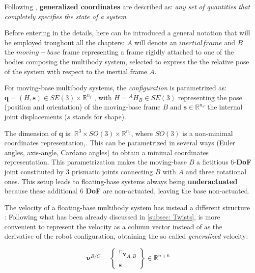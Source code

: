     Following \cite{Marion-et-al.}, \textbf{generalized coordinates} are described as: \textit{any set of quantities that completely specifies the state of a system}

    Before entering in the details, here can be introduced a general notation that will be employed troughout all the chapters:
    $A$ will denote an $inertial frame$ and $B$ the $moving-base$ frame representing a frame rigidly attached to one of the bodies composing the multibody system, selected to express the the relative pose of the system with respect to the inertial frame $A$.
    
    For moving-base multibody systems, the \textit{configuration} is parametrized as: $ \mathbf{q} = ( {H},  \mathbf{s}) \in SE(3) \times \mathbb{R}^{n_j}$ , with $ {H} = {}^{A} {H}_{B} \in SE(3)$ representing the pose (position and orientation) of the moving-base frame $B$ and $ \mathbf{s} \in \mathbb{R}^{n_J}$ the internal joint displacements ($ {s}$ stands for shape).

    The dimension of $ \mathbf{q}$ is: $\mathbb{R}^{3} \times SO(3) \times \mathbb{R}^{n_j}$, where $SO(3)$ is a non-minimal coordinates representation,.
    This can be parametrized in several ways (Euler angles, axis-angle, Cardano angles) to obtain a minimal coordinates representation. This parametrization makes the moving-base $B$ a fictitious 6-\textbf{DoF} joint constituted by 3 prismatic joints connecting $B$ with $A$ and three rotational ones.
    This setup leads to floating-base systems always being \textbf{underactuated} because these additional 6 \textbf{DoF} are non-actuated, leaving the base non-actuated.

    The velocity of a floating-base multibody system has instead a different structure \cite{Traversaro2017thesis}:
    Following what has been already discussed in \cref{subsec: Twists}, is more convenient to represent the velocity as a column vector instead of as the derivative of the robot configuration, obtaining the so called \textit{generalized} velocity:

    \begin{equation}
       \bm{\nu}^{B/C} = \begin{Bmatrix}
           {}^{C} \mathbf{v}_{A,B}\\
           \dot{\mathbf{s}}
       \end{Bmatrix} \in \mathbb{R}^{n+6}
    \label{eq: generalized multibody velocity} 
    \end{equation}

